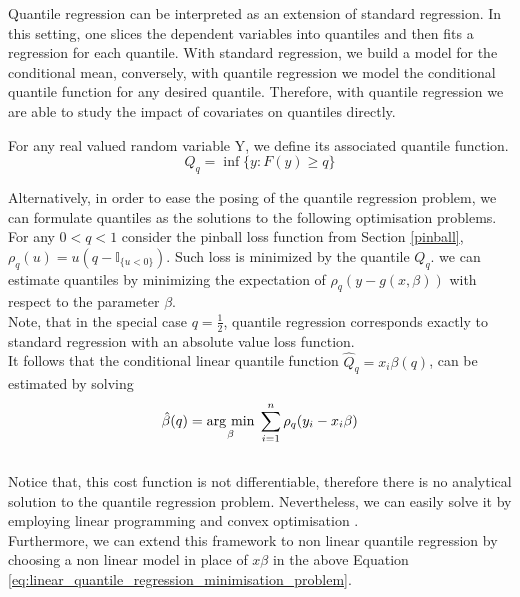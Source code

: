 Quantile regression can be interpreted as an extension of standard regression. In this setting, one slices the dependent variables into quantiles and then fits a regression for each quantile. With standard regression, we build a model for the conditional mean, conversely, with quantile regression we model the conditional quantile function for any desired quantile. 
Therefore, with quantile regression we are able to study the impact of covariates on quantiles directly.
\begin{definition}
    For any real valued random variable Y, we define its associated quantile function.
    \begin{equation}
        Q_q=\inf\{y:F(y)\geq q\}
    \end{equation}
\end{definition}
Alternatively, in order  to ease the posing of the quantile regression problem, we can formulate quantiles as the solutions to the following optimisation problems.
\\
For any $0<q<1$ consider the pinball loss function from Section \ref{pinball}, $\rho_q(u)=u(q-\mathbb{I}_{\{u<0\}})$. 
Such loss is minimized by the quantile $Q_q$.
 we can estimate quantiles by minimizing the expectation of $\rho_q(y-g(x,\beta))$ with respect to the parameter $\beta$.
\\
Note, that in the special case $q=\frac{1}{2}$,  quantile regression corresponds exactly to standard regression with an absolute value loss function.
\\
It follows that the conditional linear quantile function $\hat{Q}_q=x_i\beta(q)$, can be estimated by solving
\begin{equation}\label{eq:linear_quantile_regression_minimisation_problem}
    \hat{\beta}(q)=\underset{\beta}{\operatorname{arg}\,\operatorname{min}}\;\sum\limits_{i=1}^n \rho_q   (y_i-x_i \beta)
\end{equation}
\\
Notice that, this cost function is not differentiable, therefore there is no analytical solution to the quantile regression problem. Nevertheless, we can easily solve it by employing linear programming and convex optimisation \cite{boyd2004convex}.
\\
Furthermore, we can extend this framework to non linear quantile regression by choosing a non linear model in place of $x\beta$ in the above Equation \ref{eq:linear_quantile_regression_minimisation_problem}.

